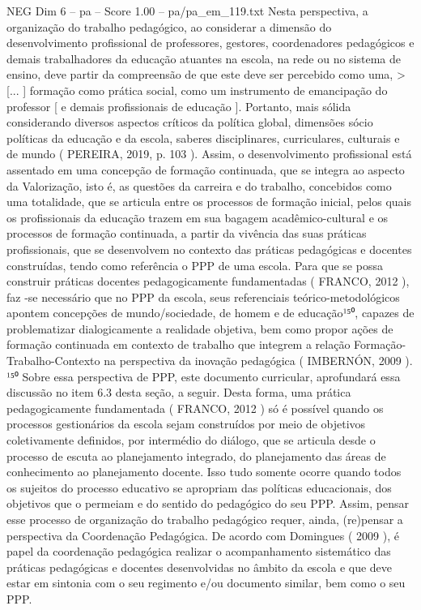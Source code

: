 \begin{textsample}{NEG Dim 6 – pa – Score 1.00 – pa/pa\_em\_119.txt}
Nesta perspectiva, a organização do trabalho pedagógico, ao considerar a dimensão do desenvolvimento profissional de professores, gestores, coordenadores pedagógicos e demais trabalhadores da educação atuantes na escola, na rede ou no sistema de ensino, deve partir da compreensão de que este deve ser percebido como uma, > [... ] formação como prática social, como um instrumento de emancipação do professor [ e demais profissionais de educação ].
Portanto, mais sólida considerando diversos aspectos críticos da política global, dimensões sócio políticas da educação e da escola, saberes disciplinares, curriculares, culturais e de mundo ( PEREIRA, 2019, p. 103 ).
Assim, o desenvolvimento profissional está assentado em uma concepção de formação continuada, que se integra ao aspecto da Valorização, isto é, as questões da carreira e do trabalho, concebidos como uma totalidade, que se articula entre os processos de formação inicial, pelos quais os profissionais da educação trazem em sua bagagem acadêmico-cultural e os processos de formação continuada, a partir da vivência das suas práticas profissionais, que se desenvolvem no contexto das práticas pedagógicas e docentes construídas, tendo como referência o PPP de uma escola.
Para que se possa construir práticas docentes pedagogicamente fundamentadas ( FRANCO, 2012 ), faz -se necessário que no PPP da escola, seus referenciais teórico-metodológicos apontem concepções de mundo/sociedade, de homem e de educação¹⁵⁰, capazes de problematizar dialogicamente a realidade objetiva, bem como propor ações de formação continuada em contexto de trabalho que integrem a relação Formação-Trabalho-Contexto na perspectiva da inovação pedagógica ( IMBERNÓN, 2009 ). ¹⁵⁰ Sobre essa perspectiva de PPP, este documento curricular, aprofundará essa discussão no item 6.3 desta seção, a seguir.
Desta forma, uma prática pedagogicamente fundamentada ( FRANCO, 2012 ) só é possível quando os processos gestionários da escola sejam construídos por meio de objetivos coletivamente definidos, por intermédio do diálogo, que se articula desde o processo de escuta ao planejamento integrado, do planejamento das áreas de conhecimento ao planejamento docente.
Isso tudo somente ocorre quando todos os sujeitos do processo educativo se apropriam das políticas educacionais, dos objetivos que o permeiam e do sentido do pedagógico do seu PPP.
Assim, pensar esse processo de organização do trabalho pedagógico requer, ainda, (re)pensar a perspectiva da Coordenação Pedagógica.
De acordo com Domingues ( 2009 ), é papel da coordenação pedagógica realizar o acompanhamento sistemático das práticas pedagógicas e docentes desenvolvidas no âmbito da escola e que deve estar em sintonia com o seu regimento e/ou documento similar, bem como o seu PPP.

\end{textsample}

